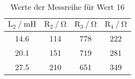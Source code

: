 \begin{table}[H]
  \centering
  \caption{Werte der Messreihe für Wert 16}
  \label{tab:tabe6}
    \begin{tabular}{c c c c}
    \toprule
    $\text{L}_2 \: / \: \si{\milli\henry} $ & $\text{R}_2 \: / \: \si{\ohm} $ &
    $\text{R}_3 \: / \: \si{\ohm} $ &
    $\text{R}_4 \: / \: \si{\ohm} $ \\
    \midrule
    14.6 & 114 & 778 & 222 \\
    20.1 & 151 & 719 & 281 \\
    27.5 & 210 & 651 & 349 \\
    \bottomrule
    \end{tabular}
\end{table}
